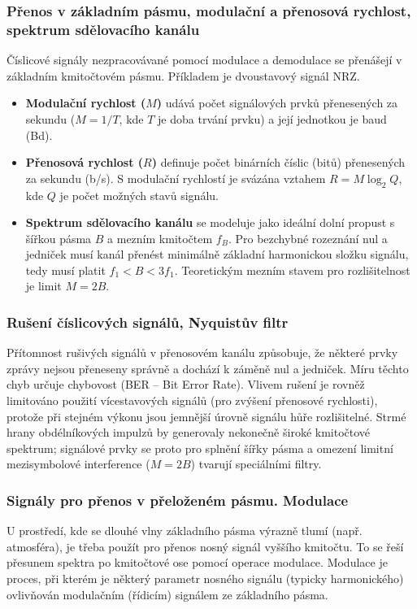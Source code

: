     \subsubsection{Přenos v základním pásmu, modulační a přenosová rychlost, spektrum sdělovacího kanálu}
        Číslicové signály nezpracovávané pomocí modulace a demodulace se přenášejí v základním kmitočtovém pásmu. Příkladem je dvoustavový signál NRZ.
    
        \begin{itemize}
            \item \textbf{Modulační rychlost ($M$)} udává počet signálových prvků přenesených za sekundu ($M = 1/T$, kde $T$ je doba trvání prvku) a její jednotkou je baud (Bd).
            \item \textbf{Přenosová rychlost ($R$)} definuje počet binárních číslic (bitů) přenesených za sekundu (b/s). S modulační rychlostí je svázána vztahem $R = M \log_2 Q$, kde $Q$ je počet možných stavů signálu.
            \item \textbf{Spektrum sdělovacího kanálu} se modeluje jako ideální dolní propust s šířkou pásma $B$ a mezním kmitočtem $f_B$. Pro bezchybné rozeznání nul a jedniček musí kanál přenést minimálně základní harmonickou složku signálu, tedy musí platit $f_1 < B < 3f_1$. Teoretickým mezním stavem pro rozlišitelnost je limit $M = 2B$.
        \end{itemize}
    \subsubsection{Rušení číslicových signálů, Nyquistův filtr} 
        Přítomnost rušivých signálů v přenosovém kanálu způsobuje, že některé prvky zprávy nejsou přeneseny správně a dochází k záměně nul a jedniček. Míru těchto chyb určuje chybovost (BER – Bit Error Rate). Vlivem rušení je rovněž limitováno použití vícestavových signálů (pro zvýšení přenosové rychlosti), protože při stejném výkonu jsou jemnější úrovně signálu hůře rozlišitelné. Strmé hrany obdélníkových impulzů by generovaly nekonečně široké kmitočtové spektrum; signálové prvky se proto pro splnění šířky pásma a omezení limitní mezisymbolové interference ($M = 2B$) tvarují speciálními filtry.

    \subsubsection{Signály pro přenos v přeloženém pásmu. Modulace} U prostředí, kde se dlouhé vlny základního pásma výrazně tlumí (např. atmosféra), je třeba použít pro přenos nosný signál vyššího kmitočtu. To se řeší přesunem spektra po kmitočtové ose pomocí operace modulace. Modulace je proces, při kterém je některý parametr nosného signálu (typicky harmonického) ovlivňován modulačním (řídicím) signálem ze základního pásma.

